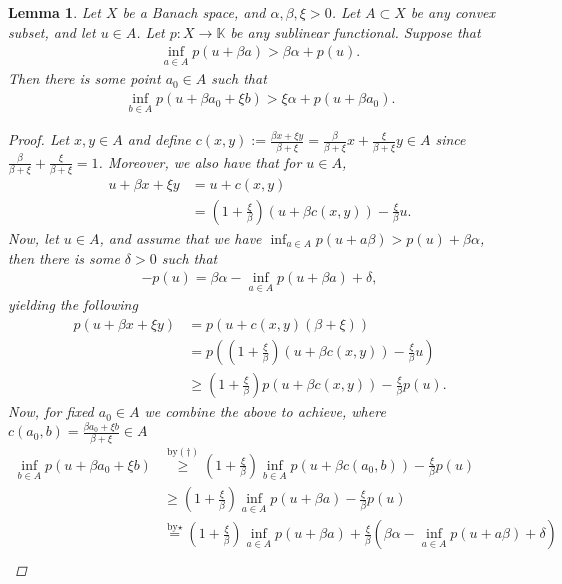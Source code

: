 \documentclass[10pt,twoside,openany,final]{memoir}
\theoremstyle{break}
\newtheorem{lemma}[section]{Lemma}
\theoremstyle{Break}
\begin{document}
\begin{lemma} \label{pryce 4}
Let $X$ be a Banach space, and $\alpha, \beta, \xi >0$. Let $A\subset X$ be any convex subset, and let $u \in A$. Let $p\colon X \to \mathbb{K}$ be any sublinear functional. Suppose that 
\begin{align*}
\inf_{a \in A} p(u+\beta a) > \beta \alpha + p(u).
\end{align*}
Then there is some point $a_{0}\in A$ such that
\begin{align*}
\inf_{b \in A} p(u+\beta a_{0}+\xi b) > \xi \alpha + p(u+\beta a_{0}).
\end{align*}
\begin{proof}
Let $x,y \in A$ and define $c(x,y):=\frac{\beta x+ \xi y}{\beta+\xi}=\frac{\beta}{\beta+\xi} x + \frac{\xi}{\beta+\xi}y \in A$ since $\frac{\beta}{\beta+\xi} + \frac{\xi}{\beta+\xi}=1$. Moreover, we also have that for $u \in A$,
\begin{align*}
u+\beta x + \xi y &= u+c(x,y)\\ &= (1 + \frac{\xi}{\beta})(u+\beta c(x,y))- \frac{\xi}{\beta}u.
\end{align*}
Now, let $u \in A$, and assume that we have $\inf_{a \in A}p(u+a\beta) > p(u)+\beta \alpha$, then there is some $\delta > 0$ such that
\begin{align*}
-p(u)=\beta \alpha -\inf_{a \in A} p(u+\beta a)+\delta, \tag{$\star$}
\end{align*}
yielding the following 
\begin{align*} 
p(u+\beta x + \xi y) &=p ( u + c(x,y)(\beta + \xi))\\ &= p\left(\left(1 + \frac{\xi}{\beta} \right)(u+\beta c(x,y))-\frac{\xi}{\beta} u\right) \\ &\geq \left(1 + \frac{\xi}{\beta} \right) p(u+\beta c(x,y)) - \frac{\xi}{\beta} p(u). \tag{$\dagger$ }
\end{align*}
Now, for fixed $a_{0} \in A$ we combine the above to achieve, where $c(a_{0},b)= \frac{\beta a_{0}+\xi b}{\beta+\xi} \in A $
\begin{align*}
\inf_{b \in A} p(u+\beta a_{0}+\xi b) & \stackrel{\text{by} (\dagger)}{\geq} \left(1+\frac{\xi}{\beta} \right) \inf_{b \in A}p(u+\beta c(a_{0},b))-\frac{\xi}{\beta} p(u) \\ &\geq \left(1+\frac{\xi}{\beta} \right)  \inf_{a \in A} p(u+\beta a)- \frac{\xi}{\beta}p(u)\\
&\stackrel{\text{by} \star}{=} \left(1+\frac{\xi}{\beta} \right) \inf_{a \in A} p(u+\beta a) + \frac{\xi}{\beta} (\beta \alpha - \inf_{a \in A} p(u+a\beta)+\delta)\\

\end{align*}
\end{proof}
\end{lemma}
\end{document}
